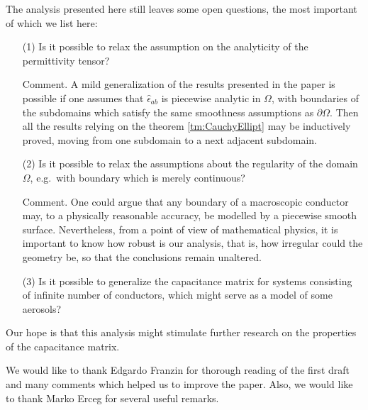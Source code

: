 \documentclass[12pt]{iopart}
\newcommand{\dd}{\partial}
\newcommand{\0}{\vct{0}}
\theoremstyle{plain} \newtheorem{tm}{Theorem}[section]
\theoremstyle{plain} \newtheorem{lm}[tm]{Lemma}
\theoremstyle{definition} \newtheorem{defn}[tm]{Definition}
\begin{document}
\medskip

The analysis presented here still leaves some open questions, the most important of which we list here:

\begin{itemize}
\item[(1)] Is it possible to relax the assumption on the analyticity of the permittivity tensor?

\smallskip

Comment. A mild generalization of the results presented in the paper is possible if one assumes that $\hat{\epsilon}_{ab}$ is piecewise analytic in $\Omega$, with boundaries of the subdomains which satisfy the same smoothness assumptions as $\dd\Omega$. Then all the results relying on the theorem \ref{tm:CauchyEllipt} may be inductively proved, moving from one subdomain to a next adjacent subdomain.



\item[(2)] Is it possible to relax the assumptions about the regularity of the domain $\Omega$, e.g.~with boundary which is merely continuous?

\smallskip

Comment. One could argue that any boundary of a macroscopic conductor may, to a physically reasonable accuracy, be modelled by a piecewise smooth surface. Nevertheless, from a point of view of mathematical physics, it is important to know how robust is our analysis, that is, how irregular could the geometry be, so that the conclusions remain unaltered.  



\item[(3)] Is it possible to generalize the capacitance matrix for systems consisting of infinite number of conductors, which might serve as a model of some aerosols?
\end{itemize}

Our hope is that this analysis might stimulate further research on the properties of the capacitance matrix.

\bigskip








\ack
We would like to thank Edgardo Franzin for thorough reading of the first draft and many comments which helped us to improve the paper. Also, we would like to thank Marko Erceg for several useful remarks. 
\end{document}
